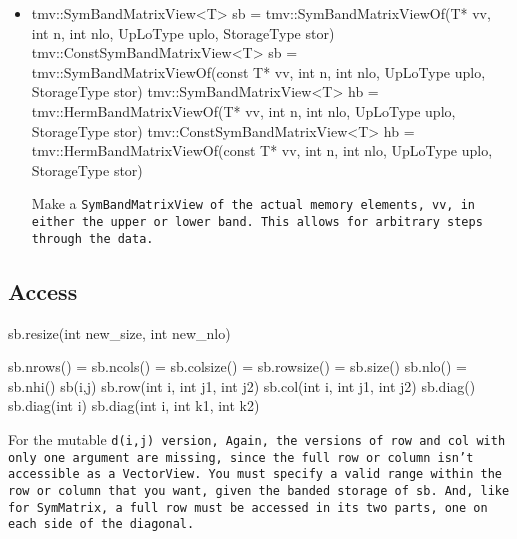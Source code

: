 \begin{itemize}
\item
\begin{tmvcode}
tmv::SymBandMatrixView<T> sb = 
      tmv::SymBandMatrixViewOf(T* vv, int n, int nlo, 
          UpLoType uplo, StorageType stor)
tmv::ConstSymBandMatrixView<T> sb = 
      tmv::SymBandMatrixViewOf(const T* vv, int n, int nlo, 
          UpLoType uplo, StorageType stor)
tmv::SymBandMatrixView<T> hb = 
      tmv::HermBandMatrixViewOf(T* vv, int n, int nlo, 
          UpLoType uplo, StorageType stor)
tmv::ConstSymBandMatrixView<T> hb = 
      tmv::HermBandMatrixViewOf(const T* vv, int n, int nlo, 
          UpLoType uplo, StorageType stor)
\end{tmvcode}
Make a \tt{SymBandMatrixView} of the actual memory elements, \tt{vv}, in either the 
upper or lower band.  This allows for arbitrary steps through the data.

\end{itemize}

\subsection{Access}
\label{SymBandMatrix_Access}

\begin{tmvcode}
sb.resize(int new_size, int new_nlo)
\end{tmvcode}

\begin{tmvcode}
sb.nrows() = sb.ncols() = sb.colsize() = sb.rowsize() = sb.size()
sb.nlo() = sb.nhi()
sb(i,j)
sb.row(int i, int j1, int j2)
sb.col(int i, int j1, int j2)
sb.diag()
sb.diag(int i)
sb.diag(int i, int k1, int k2)
\end{tmvcode}
For the mutable \tt{d(i,j)} version, 
Again, the versions of \tt{row} and \tt{col} with only one argument are
missing, since the full row or column isn't accessible as a \tt{VectorView}.
You must specify a valid range within the row or column that you want, 
given the banded storage of \tt{sb}.  And, like for \tt{SymMatrix}, a full row
must be accessed in its two parts, one on each side of the diagonal.

